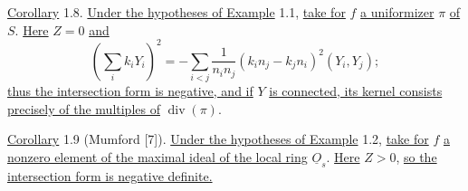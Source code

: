 \underline{Corollary} 1.8. \underline{Under the hypotheses of Example} 1.1,
\underline{take for} $f$ \underline{a uniformizer} $\pi$ \underline{of} $S$.
\underline{Here} $Z=0$ \underline{and}
\begin{equation*}
\left(\sum_i k_iY_i\right)^2
=-\sum_{i<j}\frac{1}{n_in_j}(k_in_j-k_jn_i)^2(Y_i,Y_j);
\end{equation*}
\underline{thus the intersection form is negative, and if} $Y$
\underline{is connected, its kernel consists precisely of the multiples of}
$\operatorname{div}(\pi)$.

\underline{Corollary} 1.9 (Mumford [7]). \underline{Under the hypotheses of Example}
1.2, \underline{take for} $f$ \underline{a nonzero element of the maximal ideal of
the local ring} $\underline O_s$. \underline{Here} $Z>0$, \underline{so the
intersection form is negative definite.}
